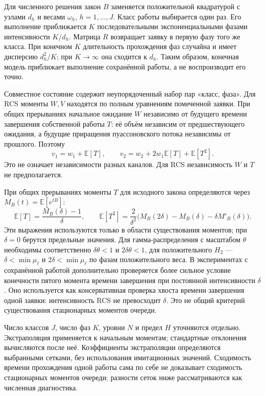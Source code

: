 Для численного решения закон \(B\) заменяется положительной квадратурой с узлами \(d_h\) и весами \(\omega_h\), \(h=1,\ldots,J\). Класс работы выбирается один раз. Его выполнение приближается \(K\) последовательными экспоненциальными фазами интенсивности \(K/d_h\). Матрица \(R\) возвращает заявку в первую фазу того же класса. При конечном \(K\) длительность прохождения фаз случайна и имеет дисперсию \(d_h^2/K\); при \(K\to\infty\) она сходится к \(d_h\). Таким образом, конечная модель приближает выполнение сохранённой работы, а не воспроизводит его точно.

Совместное состояние содержит неупорядоченный набор пар «класс, фаза». Для RCS моменты \(W,V\) находятся по полным уравнениям помеченной заявки. При общих прерываниях начальное ожидание \(W\) независимо от будущего времени завершения собственной работы \(T\): её объём независим от предшествующего ожидания, а будущие приращения пуассоновского потока независимы от прошлого. Поэтому
\[
v_1=w_1+\mathbb E[T],\qquad
v_2=w_2+2w_1\mathbb E[T]+\mathbb E[T^2].
\]
Это не означает независимости разных каналов. Для RCS независимость \(W\) и \(T\) не предполагается.

При общих прерываниях моменты \(T\) для исходного закона определяются через \(M_B(t)=\mathbb E[e^{tB}]\):
\[
\mathbb E[T]=\frac{M_B(\delta)-1}{\delta},\qquad
\mathbb E[T^2]=\frac{2}{\delta^2}\bigl(M_B(2\delta)-M_B(\delta)-\delta M'_B(\delta)\bigr).
\]
Эти выражения используются только в области существования моментов; при \(\delta=0\) берутся предельные значения. Для гамма-распределения с масштабом \(\theta\) необходимы соответственно \(\delta\theta<1\) и \(2\delta\theta<1\), для положительного \(H_2\) --- \(\delta<\min\mu_\ell\) и \(2\delta<\min\mu_\ell\) по фазам положительного веса. В экспериментах с сохранённой работой дополнительно проверяется более сильное условие конечности пятого момента времени завершения при постоянной интенсивности \(\delta\). Оно используется как консервативная проверка хвоста времени завершения одной заявки: интенсивность RCS не превосходит \(\delta\). Это не общий критерий существования стационарных моментов очереди.

Число классов \(J\), число фаз \(K\), уровни \(N\) и предел \(H\) уточняются отдельно. Экстраполяция применяется к начальным моментам; стандартные отклонения вычисляются после неё. Коэффициенты экстраполяции определяются выбранными сетками, без использования имитационных значений. Сходимость времени прохождения одной работы сама по себе не доказывает сходимость стационарных моментов очереди; разности сеток ниже рассматриваются как численная диагностика.

